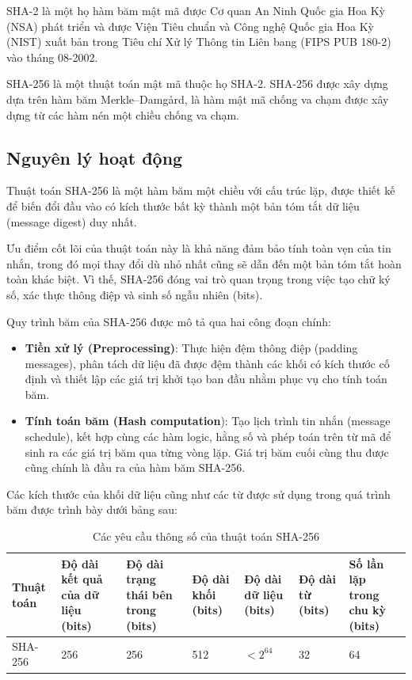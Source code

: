 SHA-2 là một họ hàm băm mật mã được Cơ quan An Ninh Quốc gia Hoa Kỳ (NSA) phát triển và được Viện Tiêu chuẩn và Công nghệ Quốc gia Hoa Kỳ (NIST) xuất bản trong Tiêu chí Xử lý Thông tin Liên bang (FIPS PUB 180-2) vào tháng 08-2002. \nocite{fips1802}

SHA-256 là một thuật toán mật mã thuộc họ SHA-2. SHA-256 được xây dựng dựa trên hàm băm Merkle–Damgård, là hàm mật mã chống va chạm được xây dựng từ các hàm nén một chiều chống va chạm. 

\subsection{Nguyên lý hoạt động}

Thuật toán SHA-256 là một hàm băm một chiều với cấu trúc lặp, được thiết kế để biến đổi đầu vào có kích thước bất kỳ thành một bản tóm tắt dữ liệu (message digest) duy nhất. 

Ưu điểm cốt lõi của thuật toán này là khả năng đảm bảo tính toàn vẹn của tin nhắn, trong đó mọi thay đổi dù nhỏ nhất cũng sẽ dẫn đến một bản tóm tắt hoàn toàn khác biệt. Vì thế, SHA-256 đóng vai trò quan trọng trong việc tạo chữ ký số, xác thực thông điệp và sinh số ngẫu nhiên (bits).

Quy trình băm của SHA-256 được mô tả qua hai công đoạn chính:
\begin{itemize}
	\item \textbf{Tiền xử lý (Preprocessing)}: Thực hiện đệm thông điệp (padding messages), phân tách dữ liệu đã được đệm thành các khối có kích thước cố định và thiết lập các giá trị khởi tạo ban đầu nhằm phục vụ cho tính toán băm.
	\item \textbf{Tính toán băm (Hash computation}): Tạo lịch trình tin nhắn (message schedule), kết hợp cùng các hàm logic, hằng số và phép toán trên từ mã để sinh ra các giá trị băm qua từng vòng lặp. Giá trị băm cuối cùng thu được cũng chính là đầu ra của hàm băm SHA-256.
\end{itemize}

Các kích thước của khối dữ liệu cũng như các từ được sử dụng trong quá trình băm được trình bày dưới bảng sau:

\begin{table}[H]
	\centering
	\caption{Các yêu cầu thông số của thuật toán SHA-256}
	\label{tab:sha256-specs-full}
	\begin{tabular}{|p{2cm}|p{2cm}|p{2cm}|p{1.5cm}|p{2cm}|p{1.5cm}|p{2cm}|}
		\hline
		\textbf{Thuật toán} & \textbf{Độ dài kết quả của dữ liệu (bits)} & \textbf{Độ dài trạng thái bên trong (bits)} & \textbf{Độ dài khối (bits)} & \textbf{Độ dài dữ liệu (bits)} & \textbf{Độ dài từ (bits)} & \textbf{Số lần lặp trong chu kỳ (bits)} \\ \hline
		SHA-256 & 256 & 256 & 512 & $< 2^{64}$ & 32 & 64 \\ \hline
	\end{tabular}
\end{table}

